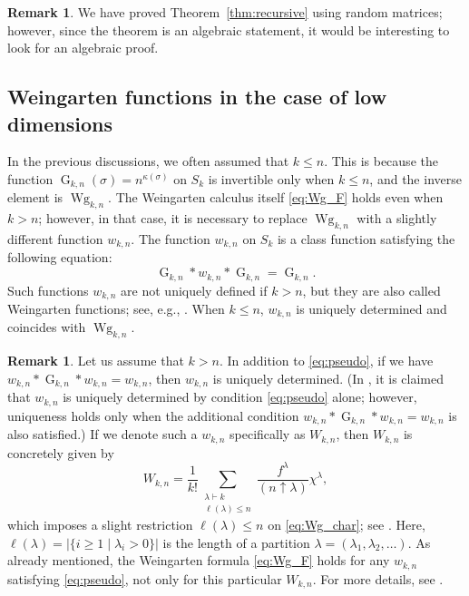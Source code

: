 \documentclass[10pt,a4paper]{amsart}
\numberwithin{equation}{section}
\theoremstyle{definition}
\newtheorem{Remark}[Theorem]{Remark}
\DeclareMathOperator{\G}{G}
\DeclareMathOperator{\Wg}{Wg}
\begin{document}
\begin{Remark}
 We have proved Theorem~\ref{thm:recursive} using random matrices; however, since the theorem is an algebraic statement, it would be interesting to look for an algebraic proof.
\end{Remark}

\subsection{Weingarten functions in the case of low dimensions} \label{subsec:low_dim}

In the previous discussions, we often assumed that $k \le n$.
This is because the function $\G_{k,n}(\sigma)=n^{\kappa(\sigma)}$ on $S_k$ is invertible only when $k \le n$, and the inverse element is $\Wg_{k,n}$.
The Weingarten calculus itself \eqref{eq:Wg_F} holds even when $k > n$; however, in that case, it is necessary to replace $\Wg_{k,n}$ with a slightly different function $w_{k,n}$.
The function $w_{k,n}$ on $S_k$ is a class function satisfying the following equation:
\begin{equation} \label{eq:pseudo}
\G_{k,n} * w_{k,n} * \G_{k,n} = \G_{k,n}.
\end{equation}
Such functions $w_{k,n}$ are not uniquely defined if $k >n$, but they are also called Weingarten functions; see, e.g., \cite{CollinsMatsumoto2009}.
When $k \le n$, $w_{k,n}$ is uniquely determined and coincides with $\Wg_{k,n}$.

\begin{Remark}
Let us assume that $k>n$.
In addition to \eqref{eq:pseudo},
if we have
$w_{k,n} *\G_{k,n} *w_{k,n} = w_{k,n}$,
then $w_{k,n}$ is uniquely determined.
(In \cite{MatsumotoCSS}, it is claimed that $w_{k,n}$ is uniquely determined by condition \eqref{eq:pseudo} alone; however, uniqueness holds only when the additional condition
$w_{k,n} * \G_{k,n} * w_{k,n} = w_{k,n}$
is also satisfied.)
If we denote such a $w_{k,n}$ specifically as $W_{k,n}$, then $W_{k,n}$ is concretely given by
\[
W_{k,n}=\frac{1}{k!} \sum_{\substack{\lambda \vdash k \\ \ell(\lambda) \le n}} \frac{f^\lambda}{(n \uparrow \lambda)} \chi^\lambda,
\]
which imposes a slight restriction $\ell(\lambda) \le n$ on \eqref{eq:Wg_char};
 see \cite[Proposition 2.3]{CollinsSniady2006}.
Here, $\ell(\lambda)=|\{i \ge 1 \mid \lambda_i>0\}|$ is the length of a partition $\lambda=(\lambda_1,\lambda_2,\dots)$.
As already mentioned, the Weingarten formula \eqref{eq:Wg_F} holds for any $w_{k,n}$ satisfying \eqref{eq:pseudo}, not only for this particular $W_{k,n}$.
For more details, see \cite{CollinsFukudaMatsumoto}.
\end{Remark}
\end{document}
